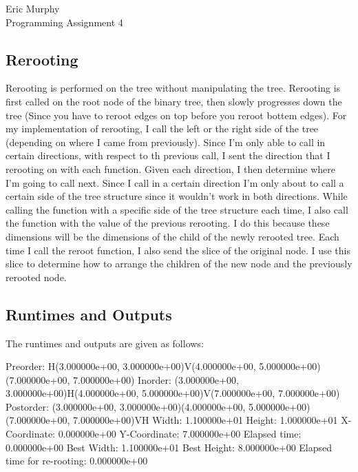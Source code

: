 \documentclass[10pt]{article}
\begin{document}
\begin{flushright}
  Eric Murphy \\
  Programming Assignment 4 \\
\end{flushright}

\subsection*{Rerooting}
Rerooting is performed on the tree without manipulating the tree. Rerooting is first called on the root node of the  binary tree, then slowly progresses down the tree (Since you have to reroot edges on top before you reroot bottem edges).
For my implementation of rerooting, I call the left or the right side of the tree (depending on where I came from previously).
Since I'm only able to call in certain directions, with respect to th previous call, I sent the direction that I rerooting on with each function.
Given each direction, I then determine where I'm going to call next. Since I call in a certain direction I'm only about to call a certain side of the tree structure since it wouldn't work in both directions.
While calling the function with a specific side of the tree structure each time, I also call the function with the value of the previous rerooting.
I do this because these dimensions will be the dimensions of the child of the newly rerooted tree.
Each time I call the reroot function, I also send the slice of the original node. I use this slice to determine how to arrange the children of the new node and the previously rerooted node.

\subsection*{Runtimes and Outputs}
The runtimes and outputs are given as follows:

\noindent \newline Preorder: H(3.000000e+00, 3.000000e+00)V(4.000000e+00, 5.000000e+00)(7.000000e+00, 7.000000e+00)
\noindent Inorder: (3.000000e+00, 3.000000e+00)H(4.000000e+00, 5.000000e+00)V(7.000000e+00, 7.000000e+00)
\noindent Postorder: (3.000000e+00, 3.000000e+00)(4.000000e+00, 5.000000e+00)(7.000000e+00, 7.000000e+00)VH
\noindent Width: 1.100000e+01
\noindent Height: 1.000000e+01
\noindent X-Coordinate: 0.000000e+00
\noindent Y-Coordinate: 7.000000e+00
\noindent Elapsed time: 0.000000e+00
\noindent Best Width: 1.100000e+01
\noindent Best Height: 8.000000e+00
\noindent Elapsed time for re-rooting: 0.000000e+00
\end{document}

